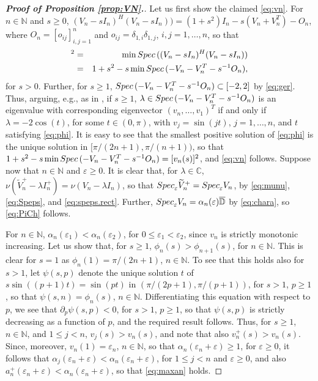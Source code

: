 \documentclass[preprint,1p,11pt]{elsarticle}
\newcommand\C{{\mathbb C}}
\newcommand\D{{\mathbb D}}
\newcommand\N{{\mathbb N}}
\newcommand\eps{{\varepsilon}}
\newcommand\Spec{{\rm Spec}\,}  %
\newcommand\Specn{{\rm Spec}}   %
\newcommand\Speps{{\rm Spec}_\eps}
\numberwithin{equation}{section}   %
\numberwithin{figure}{section}  %
\begin{document}
\begin{proof}[{\bf Proof of Proposition \ref{prop:VN}.}] Let us first show the claimed \eqref{eq:vn}. For $n\in \N$ and $s\geq 0$, $(V_n-sI_n)^H(V_n-sI_n))=(1+s^2)I_n-s(V_n+V_n^T)-O_n$, where $O_n=[o_{ij}]_{i,j=1}^n$ and $o_{ij}=\delta_{1,i}\delta_{1,j}$, $i,j=1,\ldots,n$, so that
\begin{eqnarray*}
[s_{\min}(V_n-sI_n)]^2 &=& \min \Spec((V_n-sI_n)^H(V_n-sI_n))\\
&=&1+s^2-s\min \Spec(-V_n-V_n^T-s^{-1}O_n),
\end{eqnarray*}
for $s>0$. Further, for $s\geq 1$, $\Spec(-V_n-V_n^T-s^{-1}O_n)\subset [-2,2]$ by \eqref{eq:ger}. Thus,  arguing, e.g., as in \cite[\S8.1]{CW.Heng.ML:SpecIncl1}, if $s\geq 1$, $\lambda\in \Spec(-V_n-V_n^T-s^{-1}O_n)$ is an eigenvalue with corresponding eigenvector $(v_n,\ldots,v_1)^T$ if and only if $\lambda= -2\cos(t)$, for some $t\in (0,\pi)$, with $v_j=\sin(jt)$, $j=1,\ldots,n$, and $t$ satisfying \eqref{eq:phi}. It is easy to see that the smallest positive solution of \eqref{eq:phi} is the unique solution in $[\pi/(2n+1),\pi/(n+1))$, so that $1+s^2-s\min \Spec(-V_n-V_n^T-s^{-1}O_n)=[v_n(s)]^2$, and \eqref{eq:vn} follows.
Suppose now that $n\in \N$ and $\eps\geq 0$. It is clear that, for $\lambda\in \C$, $\nu(\widetilde V^+_n-\lambda I_n^+)=\nu(V_n-\lambda I_n)$, so that $\Specn_{\eps} \widetilde V^{+}_n = \Specn_{\eps}  V_n$, by \eqref{eq:munu}, \eqref{eq:Speps}, and \eqref{eq:speps.rect}. Further, $\Speps V_n = \alpha_n(\eps)\overline{\D}$ by \eqref{eq:chara}, so \eqref{eq:PiCh} follows.

For $n\in \N$, $\alpha_n(\eps_1) <\alpha_n(\eps_2)$, for $0\leq \eps_1<\eps_2$, since $v_n$ is strictly monotonic increasing. Let us show that, for $s\geq 1$, $\phi_n(s)>\phi_{n+1}(s)$, for $n\in \N$. This is clear for $s=1$ as $\phi_n(1)= \pi/(2n+1)$, $n\in \N$. To see that this holds also for $s>1$, let $\psi(s,p)$ denote the unique solution $t$ of $s\sin((p+1)t)=\sin(pt)$ in $(\pi/(2p+1),\pi/(p+1))$, for $s>1$, $p\geq 1$, so that $\psi(s,n)=\phi_n(s)$, $n\in \N$. Differentiating this equation with respect to $p$, we see that $\partial_p\psi(s,p) < 0$, for $s>1$, $p\geq 1$, so that $\psi(s,p)$ is strictly decreasing as a function of $p$, and the required result follows. Thus, for $s\geq 1$, $n\in \N$, and $1\leq j<n$, $v_j(s) > v_{n}(s)$, and note that also $v_n^+(s) > v_n(s)$. Since, moreover, $v_n(1)=\eps_n$, $n\in \N$, so that $\alpha_n(\eps_n+\eps) \geq 1$, for $\eps\geq 0$, it follows that $\alpha_j(\eps_n+\eps) < \alpha_n(\eps_n+\eps)$, for $1\leq j<n$ and $\eps\geq 0$, and also $a^+_n(\eps_n+\eps) < \alpha_n(\eps_n+\eps)$, so that \eqref{eq:maxan} holds.



\end{proof}
\end{document}
